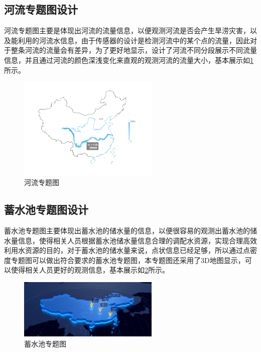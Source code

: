 \subsection{河流专题图设计}
河流专题图主要是体现出河流的流量信息，以便观测河流是否会产生旱涝灾害，以及能利用的河流水信息，由于传感器的设计是检测河流中的某个点的流量，因此对于整条河流的流量会有差异，为了更好地显示，设计了河流不同分段展示不同流量信息，并且通过河流的颜色深浅变化来直观的观测河流的流量大小，基本展示如\ref{fig:heliu}所示。
\begin{figure}[!htb]%
	\centering
	\includegraphics[width=0.60\textwidth]{figs/river_1.png}
	\caption{河流专题图}
	\label{fig:heliu}
\end{figure}

\subsection{蓄水池专题图设计}
蓄水池专题图主要体现出蓄水池的储水量的信息，以便很容易的观测出蓄水池的储水量信息，使得相关人员根据蓄水池储水量信息合理的调配水资源，实现合理高效利用水资源的目的，对于蓄水池的储水量来说，点状信息已经足够，所以通过点密度专题图可以做出符合要求的蓄水池专题图，本专题图还采用了3D地图显示，可以使得相关人员更好的观测信息，基本展示如\ref{fig:xushuici}所示。
\begin{figure}[!htb]%
	\centering
	\includegraphics[width=0.60\textwidth]{figs/xushuici .png}
	\caption{蓄水池专题图}
	\label{fig:xushuici}
\end{figure}
